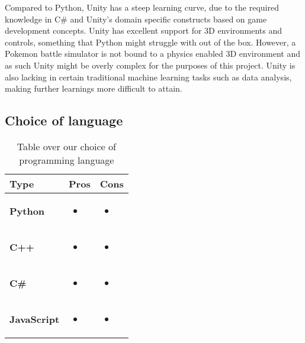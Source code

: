 Compared to Python, Unity has a steep learning curve,
due to the required knowledge in C\# and Unity's domain specific constructs based on game development concepts. Unity has excellent support for 3D environments and controls,
something that Python might struggle with out of the box. However, a Pokemon battle simulator is not bound to a physics enabled 3D environment and as such
Unity might be overly complex for the purposes of this project.
Unity is also lacking in certain traditional machine learning tasks such as data analysis, making further learnings more difficult to attain.  

\subsection{Choice of language}

\begin{table}[H]      
    \begin{tabular}{| m{3.5cm} | m{5cm} | m{5cm} |}
          \hline
          \textbf{Type} & \textbf{Pros} & \textbf{Cons} \\ 
          \hline
          \textbf{Python} & 
          \begin{itemize}
                \item 
          \end{itemize} & 
          \begin{itemize}
                \item 
          \end{itemize} \\ 
          \hline
          \textbf{C++} & 
          \begin{itemize}
                \item 
          \end{itemize} & 
          \begin{itemize}
                \item 
          \end{itemize} \\ 
          \hline
          \textbf{C\#} & 
          \begin{itemize}
                \item 
          \end{itemize} & 
          \begin{itemize}
                \item 
          \end{itemize} \\ 
          \hline
          \textbf{JavaScript} & 
          \begin{itemize}
                \item 
          \end{itemize} & 
          \begin{itemize}
                \item 
          \end{itemize} \\ 
          \hline
    \end{tabular}
    \caption{Table over our choice of programming language}
    \label{tab:choice-of-language}  
\end{table}
